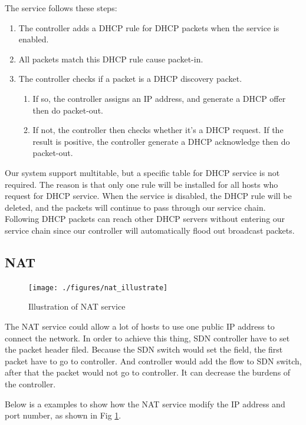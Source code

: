 \documentclass[journal]{IEEEtran}
\begin{document}
The service follows these steps:
\begin{enumerate}
\item The controller adds a DHCP rule for DHCP packets when the service is enabled.
\item All packets match this DHCP rule cause packet-in.
\item The controller checks if a packet is a DHCP discovery packet.
  \begin{enumerate}
    \item If so, the controller assigns an IP address, and generate a DHCP offer then do packet-out.
    \item If not, the controller then checks whether it's a DHCP request. If the result is positive, the controller generate a DHCP acknowledge then do packet-out.
  \end{enumerate}
\end{enumerate}

Our system support multitable, but a specific table for DHCP service is not required.
The reason is that only one rule will be installed for all hosts who request for DHCP service.
When the service is disabled, the DHCP rule will be deleted,
and the packets will continue to pass through our service chain.
Following DHCP packets can reach other DHCP servers without entering our service chain
since our controller will automatically flood out broadcast packets.


\subsection{NAT}
\begin{figure}[!t]
\centering
\texttt{[image: ./figures/nat\_illustrate]}
\caption{Illustration of NAT service}
\label{fig:nat_illustration}
\end{figure}
The NAT service could allow a lot of hosts to use one public IP address to connect the network.
In order to achieve this thing, SDN controller have to set the packet header filed.
Because the SDN switch would set the field, the first packet have to go to controller.
And controller would add the flow to SDN switch, after that the packet would not go to controller.
It can decrease the burdens of the controller.

Below is a examples to show how the NAT service modify the IP address and port number,
as shown in Fig \ref{fig:nat_illustration}.
\end{document}
